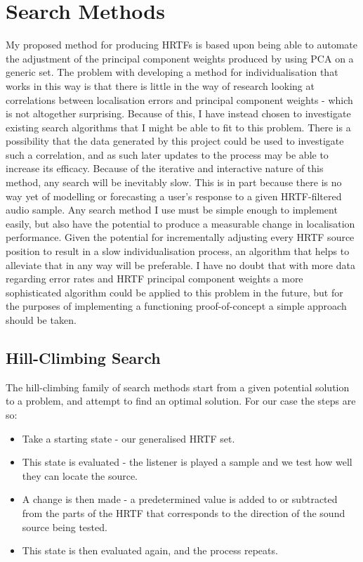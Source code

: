 \section{Search Methods}

My proposed method for producing HRTFs is based upon being able to automate the adjustment of the principal component weights produced by using PCA on a generic set. The problem with developing a method for individualisation that works in this way is that there is little in the way of research looking at correlations between localisation errors and principal component weights - which is not altogether surprising. Because of this, I have instead chosen to investigate existing search algorithms that I might be able to fit to this problem. There is a possibility that the data generated by this project could be used to investigate such a correlation, and as such later updates to the process may be able to increase its efficacy. Because of the iterative and interactive nature of this method, any search will be inevitably slow. This is in part because there is no way yet of modelling or forecasting a user's response to a given HRTF-filtered audio sample. Any search method I use must be simple enough to implement easily, but also have the potential to produce a measurable change in localisation performance. Given the potential for incrementally adjusting every HRTF source position to result in a slow individualisation process, an algorithm that helps to alleviate that in any way will be preferable. I have no doubt that with more data regarding error rates and HRTF principal component weights a more sophisticated algorithm could be applied to this problem in the future, but for the purposes of implementing a functioning proof-of-concept a simple approach should be taken.

\subsection{Hill-Climbing Search}
The hill-climbing family of search methods \citep{norvig1995} start from a given potential solution to a problem, and attempt to find an optimal solution. For our case the steps are so: 
\begin{itemize}
\item Take a starting state - our generalised HRTF set.
\item This state is evaluated - the listener is played a sample and we test how well they can locate the source. 
\item A change is then made - a predetermined value is added to or subtracted from the parts of the HRTF that corresponds to the direction of the sound source being tested.
\item This state is then evaluated again, and the process repeats. 
\end{itemize} 


